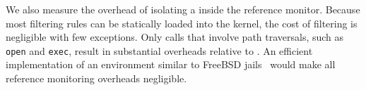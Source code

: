 








We also measure the overhead of isolating a \graphene{} \picoproc{} inside the reference monitor.
Because most filtering rules can be statically loaded into the kernel,
the cost of filtering is negligible with few exceptions.
Only calls that
involve path traversals, such as {\tt open} and {\tt exec}, result in substantial overheads relative to \graphene{}.
An efficient implementation of an environment similar to FreeBSD  jails~\cite{jails}
would make all reference monitoring overheads negligible.




